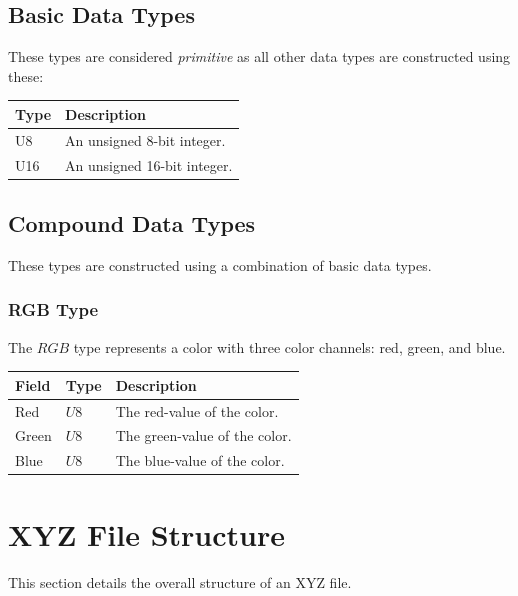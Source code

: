 \documentclass{article}
\begin{document}
\subsection{Basic Data Types}
These types are considered \textit{primitive} as all other data types are constructed using these:

\begin{table}[h!]
\centering
\begin{tabular}{|l|l|}
\hline
\textbf{Type} & \textbf{Description}        \\ \hline
U8            & An unsigned 8-bit integer.  \\ \hline
U16           & An unsigned 16-bit integer. \\ \hline
\end{tabular}
\end{table}

\subsection{Compound Data Types}
These types are constructed using a combination of basic data types.

\subsubsection{RGB Type}
The $RGB$ type represents a color with three color channels: red, green, and blue.

\begin{table}[h!]
\centering
\begin{tabular}{|l|l|l|}
\hline
\textbf{Field} & \textbf{Type} & \textbf{Description}          \\ \hline
Red            & $U8$          & The red-value of the color.   \\ \hline
Green          & $U8$          & The green-value of the color. \\ \hline
Blue           & $U8$          & The blue-value of the color.  \\ \hline
\end{tabular}
\end{table}

\section{XYZ File Structure}
This section details the overall structure of an XYZ file.
\end{document}
